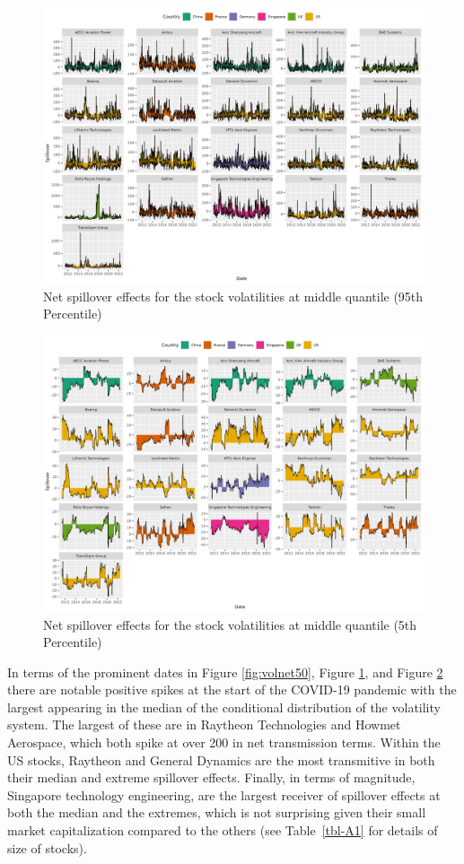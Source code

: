 \documentclass[
  letterpaper,
  DIV=11,
  numbers=noendperiod]{scrartcl}
\begin{document}
\begin{figure}
\centering
  \includegraphics{plots/fig-volnet95.png}
  \caption{Net spillover effects for the stock volatilities at middle quantile (95th Percentile)}
  \label{fig:volnet95}
\end{figure}

\begin{figure}
\centering
  \includegraphics{plots/fig-volnet5.png}
  \caption{Net spillover effects for the stock volatilities at middle quantile (5th Percentile)}
  \label{fig:volnet5}
\end{figure}

In terms of the prominent dates in Figure \ref{fig:volnet50}, Figure
\ref{fig:volnet95}, and Figure \ref{fig:volnet5} there are notable
positive spikes at the start of the COVID-19 pandemic with the largest
appearing in the median of the conditional distribution of the
volatility system. The largest of these are in Raytheon Technologies and
Howmet Aerospace, which both spike at over 200 in net transmission
terms. Within the US stocks, Raytheon and General Dynamics are the most
transmitive in both their median and extreme spillover effects. Finally,
in terms of magnitude, Singapore technology engineering, are the largest
receiver of spillover effects at both the median and the extremes, which
is not surprising given their small market capitalization compared to
the others (see Table~\ref{tbl-A1} for details of size of stocks).
\end{document}
